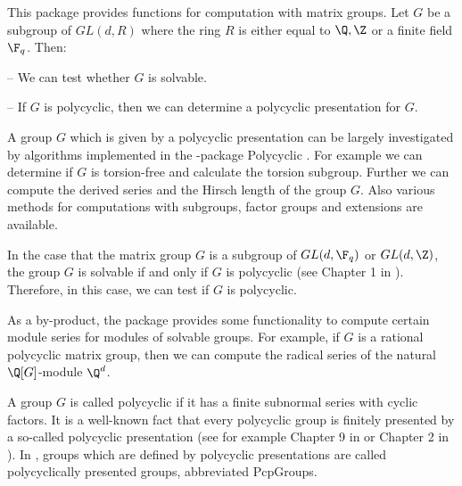


This package provides functions for computation with matrix
groups. Let $G$ be a subgroup of $GL(d,R)$ where the ring $R$ is
either equal to $\Q,\Z$ or a finite field $\F_q$.
Then: 
\beginlist
\item{--} 
    We can test whether $G$ is solvable.
\item{--}
    If $G$ is polycyclic, then we can determine a polycyclic
    presentation for $G$. 
\endlist

A group $G$ which is given by a polycyclic presentation can be largely
investigated by algorithms implemented in the {\GAP}-package
Polycyclic \cite{polycyclic}. For example 
we can determine if $G$ is torsion-free
and calculate the torsion subgroup. Further we can compute the derived
series and the Hirsch length of the group $G$. Also various methods for
computations with subgroups, factor groups and extensions are
available.

In the case that the matrix group 
$G$ is a subgroup of $GL(d,\F_q)$ or $GL(d,\Z)$, the
group $G$ is solvable if and only if $G$ is polycyclic (see Chapter 1
in \cite{Segal}). 
Therefore, in this case, we can test if $G$ is polycyclic. 

As a by-product, the {\Polenta} package 
provides some functionality to compute certain module series for
modules of solvable groups. For example, if
$G$ is a rational polycyclic matrix group, then we can compute the 
radical series of the natural
$\Q[G]$-module $\Q^d$.  


A group $G$ is called polycyclic if it has a finite subnormal
series with cyclic 
factors. It is a well-known fact that every polycyclic group is
finitely presented by a so-called polycyclic presentation (see
for example Chapter 9 in \cite{Sims} or Chapter 2 in \cite{polycyclic} ). 
In {\GAP}, groups which are defined by polycyclic
 presentations are called
polycyclically presented groups, abbreviated PcpGroups.
 

